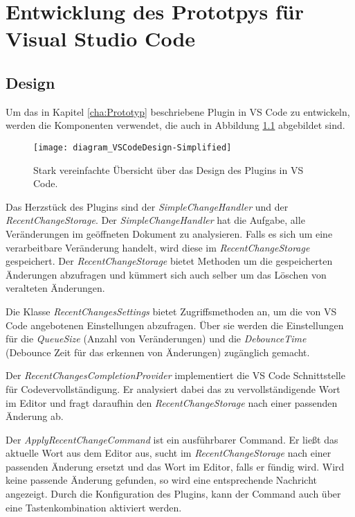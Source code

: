 \chapter{Entwicklung des Prototpys für Visual Studio Code}
\label{cha:EntwicklungVsCode}

\section{Design}
\label{sec:EntwicklungVsCode_Design}

Um das in Kapitel \ref{cha:Prototyp} beschriebene Plugin in VS Code
zu entwickeln, werden die Komponenten verwendet, die auch in 
Abbildung \ref{fig:diagram_VSCodeDesign-Simplified} abgebildet sind.
\begin{figure}
    \centering
    \texttt{[image: diagram\_VSCodeDesign-Simplified]}
    \caption{Stark vereinfachte Übersicht über das Design des Plugins in  VS Code.}
    \label{fig:diagram_VSCodeDesign-Simplified}
\end{figure}  

Das Herzstück des Plugins sind der \emph{SimpleChangeHandler} und
der \emph{RecentChangeStorage}. Der \emph{SimpleChangeHandler} hat die Aufgabe,
alle Veränderungen im geöffneten Dokument zu analysieren. Falls es sich um
eine verarbeitbare Veränderung handelt, wird diese im \emph{RecentChangeStorage}
gespeichert. Der \emph{RecentChangeStorage} bietet Methoden um die
gespeicherten Änderungen abzufragen und kümmert sich auch selber um das
Löschen von veralteten Änderungen.

Die Klasse \emph{RecentChangesSettings} bietet Zugriffsmethoden an,
um die von VS Code angebotenen Einstellungen abzufragen. Über sie
werden die Einstellungen für die \emph{QueueSize} (Anzahl von Veränderungen)
und die \emph{DebounceTime} (Debounce Zeit für das erkennen von Änderungen)
zugänglich gemacht.

Der \emph{RecentChangesCompletionProvider} implementiert die VS Code Schnittstelle
für Codevervollständigung. Er analysiert dabei das zu vervollständigende Wort
im Editor und fragt daraufhin den \emph{RecentChangeStorage} nach einer passenden
Änderung ab.

Der \emph{ApplyRecentChangeCommand} ist ein ausführbarer Command. Er ließt
das aktuelle Wort aus dem Editor aus, sucht im \emph{RecentChangeStorage}
nach einer passenden Änderung ersetzt und das Wort im Editor, falls
er fündig wird. Wird keine passende Änderung gefunden, so wird eine entsprechende
Nachricht angezeigt. Durch die Konfiguration des Plugins, kann der
Command auch über eine Tastenkombination aktiviert werden.

